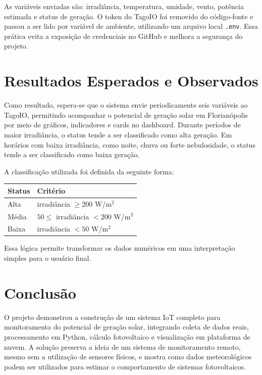 \documentclass[12pt,a4paper]{article}
\begin{document}
As variáveis enviadas são: irradiância, temperatura, umidade, vento, potência estimada e status de geração. O token do TagoIO foi removido do código-fonte e passou a ser lido por variável de ambiente, utilizando um arquivo local \texttt{.env}. Essa prática evita a exposição de credenciais no GitHub e melhora a segurança do projeto.

\section{Resultados Esperados e Observados}

Como resultado, espera-se que o sistema envie periodicamente seis variáveis ao TagoIO, permitindo acompanhar o potencial de geração solar em Florianópolis por meio de gráficos, indicadores e cards no dashboard. Durante períodos de maior irradiância, o status tende a ser classificado como alta geração. Em horários com baixa irradiância, como noite, chuva ou forte nebulosidade, o status tende a ser classificado como baixa geração.

A classificação utilizada foi definida da seguinte forma:

\begin{center}
\begin{tabular}{ll}
\toprule
\textbf{Status} & \textbf{Critério} \\
\midrule
Alta & irradiância $\geq 200$ W/m$^2$ \\
Média & $50 \leq$ irradiância $< 200$ W/m$^2$ \\
Baixa & irradiância $< 50$ W/m$^2$ \\
\bottomrule
\end{tabular}
\end{center}

Essa lógica permite transformar os dados numéricos em uma interpretação simples para o usuário final.

\section{Conclusão}

O projeto demonstrou a construção de um sistema IoT completo para monitoramento do potencial de geração solar, integrando coleta de dados reais, processamento em Python, cálculo fotovoltaico e visualização em plataforma de nuvem. A solução preserva a ideia de um sistema de monitoramento remoto, mesmo sem a utilização de sensores físicos, e mostra como dados meteorológicos podem ser utilizados para estimar o comportamento de sistemas fotovoltaicos.
\end{document}
